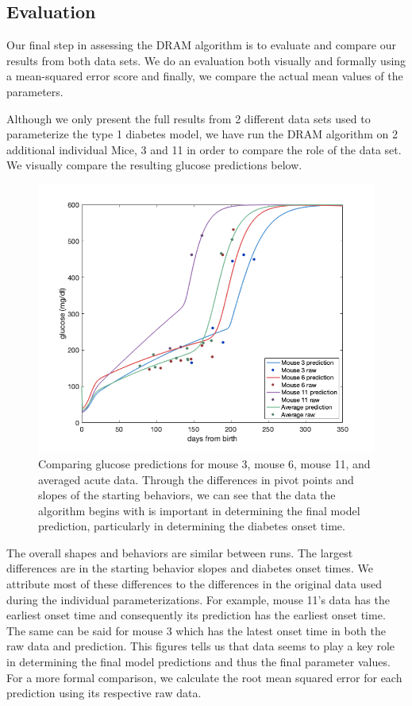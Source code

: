 \documentclass{article}
\begin{document}
\subsection{Evaluation}
Our final step in assessing the DRAM algorithm is to evaluate and compare our results from both data sets. We do an evaluation both visually and formally using a mean-squared error score and finally, we compare the actual mean values of the parameters. 
\par Although we only present the full results from 2 different data sets used to parameterize the type 1 diabetes model, we have run the DRAM algorithm on 2 additional individual Mice, 3 and 11 in order to compare the role of the data set. We visually compare the resulting glucose predictions below.
\begin{figure}[H]
    \centering
    \includegraphics[width=15cm]{MCMC_figs/dram_t1d_final/comp_3_6_11_avg_finalfig.png}
    \caption{Comparing glucose predictions for mouse 3, mouse 6, mouse 11, and averaged acute data. Through the differences in pivot points and slopes of the starting behaviors, we can see that the data the algorithm begins with is important in determining the final model prediction, particularly in determining the diabetes onset time.}
    \label{fig:21mcmc}
\end{figure}
The overall shapes and behaviors are similar between runs. The largest differences are in the starting behavior slopes and diabetes onset times. We attribute most of these differences to the differences in the original data used during the individual parameterizations. For example, mouse 11's data has the earliest onset time and consequently its prediction has the earliest onset time. The same can be said for mouse 3 which has the latest onset time in both the raw data and prediction. This figures tells us that data seems to play a key role in determining the final model predictions and thus the final parameter values. For a more formal comparison, we calculate the root mean squared error for each prediction using its respective raw data.
\end{document}
